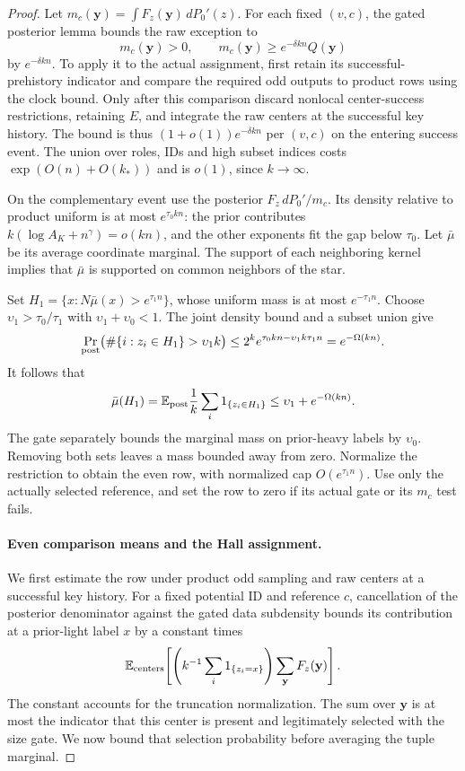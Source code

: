 \begin{proof}
Let \(m_c(\mathbf y)=\int F_z(\mathbf y)\,dP_0'(z)\). For each fixed
\((v,c)\), the gated posterior lemma bounds the raw exception to
\[
 m_c(\mathbf y)>0,\qquad
 m_c(\mathbf y)\ge e^{-\delta kn}Q(\mathbf y)
\]
by \(e^{-\delta kn}\). To apply it to the actual assignment, first
retain its successful-prehistory indicator and compare the required
odd outputs to product rows using the clock bound. Only after this
comparison discard nonlocal center-success restrictions, retaining \(E\),
and integrate the raw centers at the successful key history. The bound
is thus \((1+o(1))e^{-\delta kn}\) per \((v,c)\) on the entering
success event. The union over roles, IDs and high subset indices costs
\(\exp(O(n)+O(k_*))\) and is \(o(1)\), since \(k\to\infty\).

On the complementary event use the posterior
\(F_z\,dP_0'/m_c\). Its density relative to product uniform is at most
\(e^{\tau_0kn}\): the prior contributes
\(k(\log A_K+n^\gamma)=o(kn)\), and the other exponents fit the gap
below \(\tau_0\). Let \(\bar\mu\) be its average coordinate marginal.
The support of each neighboring kernel implies that \(\bar\mu\) is
supported on common neighbors of the star.

Set \(H_1=\{x:N\bar\mu(x)>e^{\tau_1n}\}\), whose uniform mass is at
most \(e^{-\tau_1n}\). Choose
\(\upsilon_1>\tau_0/\tau_1\) with
\(\upsilon_1+\upsilon_0<1\). The joint density bound and a subset union
give
\[
 \Pr_{\rm post}\bigl(\#\{i:z_i\in H_1\}>\upsilon_1k\bigr)
 \le 2^k e^{\tau_0kn-\upsilon_1k\tau_1n}
 =e^{-\Omega(kn)}.
\]
It follows that
\[
 \bar\mu(H_1)
 =\mathbb E_{\rm post}\frac1k\sum_i1_{\{z_i\in H_1\}}
 \le\upsilon_1+e^{-\Omega(kn)}.
\]
The gate separately bounds the marginal mass on prior-heavy labels by
\(\upsilon_0\). Removing both sets leaves a mass bounded away from
zero. Normalize the restriction to obtain the even row, with normalized
cap \(O(e^{\tau_1n})\). Use only the actually selected reference, and
set the row to zero if its actual gate or its \(m_c\) test fails.

\paragraph{Even comparison means and the Hall assignment.}
We first estimate the row under product odd sampling and raw centers at
a successful key history. For a fixed potential ID and reference \(c\),
cancellation of the posterior denominator against the gated data
subdensity bounds its contribution at a prior-light label \(x\) by a
constant times
\[
 \mathbb E_{\rm centers}\!\left[
    \left(k^{-1}\sum_i1_{\{z_i=x\}}\right)
                  \sum_{\mathbf y}F_z(\mathbf y)\right].
\]
The constant accounts for the truncation normalization. The sum over
\(\mathbf y\) is at most the indicator that this center is present
and legitimately selected with the size gate. We now bound that selection
probability before averaging the tuple marginal.


\end{proof}
